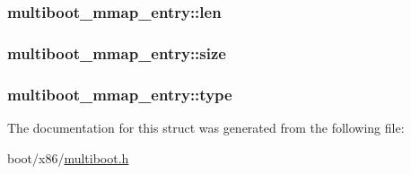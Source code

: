 \subsubsection[{len}]{ multiboot\+\_\+mmap\+\_\+entry\+::len}\label{structmultiboot__mmap__entry_a6bfa44919a328492fa4e3d6239a23352}
\hypertarget{structmultiboot__mmap__entry_af10c1835051b4b08bdcdb538c1b4101d}{}
\subsubsection[{size}]{ multiboot\+\_\+mmap\+\_\+entry\+::size}\label{structmultiboot__mmap__entry_af10c1835051b4b08bdcdb538c1b4101d}
\hypertarget{structmultiboot__mmap__entry_aa6fc447c57f074d0babfe3bbb7017de9}{}
\subsubsection[{type}]{ multiboot\+\_\+mmap\+\_\+entry\+::type}\label{structmultiboot__mmap__entry_aa6fc447c57f074d0babfe3bbb7017de9}


The documentation for this struct was generated from the following file\+:\begin{DoxyCompactItemize}
\item 
boot/x86/\hyperlink{multiboot_8h}{multiboot.\+h}\end{DoxyCompactItemize}
